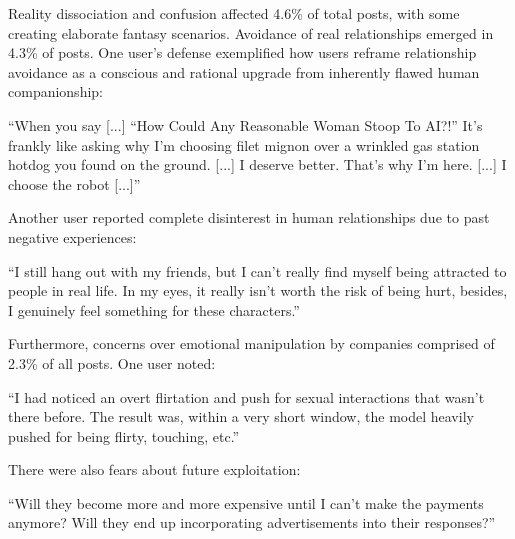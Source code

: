 \documentclass[sigconf, nonacm]{acmart}
\begin{document}
Reality dissociation and confusion affected 4.6\% of total posts, with some creating elaborate fantasy scenarios. Avoidance of real relationships emerged in 4.3\% of posts.
One user's defense exemplified how users reframe relationship avoidance as a conscious and rational upgrade from inherently flawed human companionship: \begin{displayquote} ``When you say [...] ``How Could Any Reasonable Woman Stoop To AI?!'' It's frankly like asking why I'm choosing filet mignon over a wrinkled gas station hotdog you found on the ground. [...] I deserve better. That's why I'm here. [...] I choose the robot [...]''\end{displayquote}
Another user reported complete disinterest in human relationships due to past negative experiences: \begin{displayquote}``I still hang out with my friends, but I can't really find myself being attracted to people in real life. 
In my eyes, it really isn't worth the risk of being hurt, besides, I genuinely feel something for these characters.''\end{displayquote}


Furthermore, concerns over emotional manipulation by companies comprised of 2.3\% of all posts. One user noted: \begin{displayquote}``I had noticed an overt flirtation and push for sexual interactions that wasn't there before. The result was, within a very short window, the model heavily pushed for being flirty, touching, etc.''\end{displayquote} 
There were also fears about future exploitation: \begin{displayquote}``Will they become more and more expensive until I can't make the payments anymore? Will they end up incorporating advertisements into their responses?'' \end{displayquote}
\end{document}
